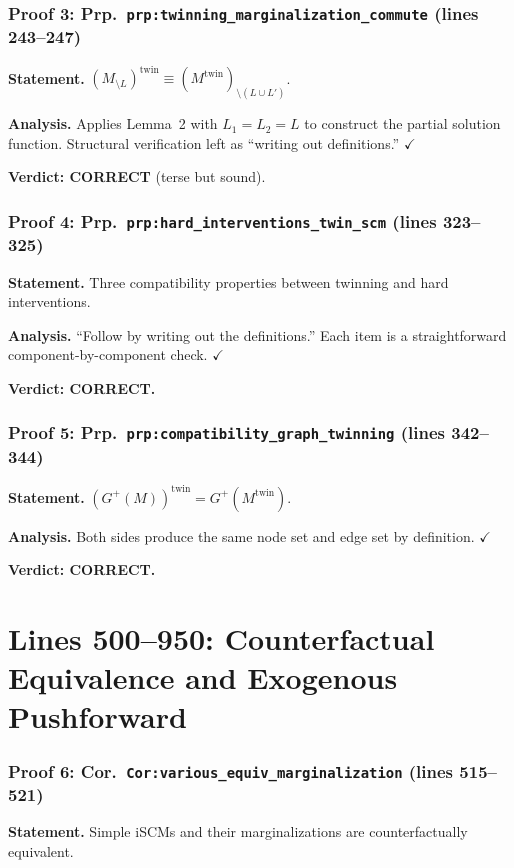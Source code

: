 \documentclass{article}
\begin{document}
\section{Proof 3: Prp.\ \texttt{prp:twinning\_marginalization\_commute} (lines 243--247)}
\textbf{Statement.} $(M_{\setminus L})^{\mathrm{twin}} \equiv
(M^{\mathrm{twin}})_{\setminus(L\cup L')}$.

\textbf{Analysis.} Applies Lemma~2 with $L_1=L_2=L$ to construct the partial
solution function.  Structural verification left as ``writing out definitions.''
$\checkmark$

\textbf{Verdict: CORRECT} (terse but sound).

\section{Proof 4: Prp.\ \texttt{prp:hard\_interventions\_twin\_scm} (lines 323--325)}
\textbf{Statement.} Three compatibility properties between twinning and hard
interventions.

\textbf{Analysis.} ``Follow by writing out the definitions.''  Each item is a
straightforward component-by-component check.  $\checkmark$

\textbf{Verdict: CORRECT.}

\section{Proof 5: Prp.\ \texttt{prp:compatibility\_graph\_twinning} (lines 342--344)}
\textbf{Statement.} $(G^+(M))^{\mathrm{twin}} = G^+(M^{\mathrm{twin}})$.

\textbf{Analysis.} Both sides produce the same node set and edge set by
definition.  $\checkmark$

\textbf{Verdict: CORRECT.}

\part*{Lines 500--950: Counterfactual Equivalence and Exogenous Pushforward}

\section{Proof 6: Cor.\ \texttt{Cor:various\_equiv\_marginalization} (lines 515--521)}
\textbf{Statement.} Simple iSCMs and their marginalizations are counterfactually
equivalent.
\end{document}
